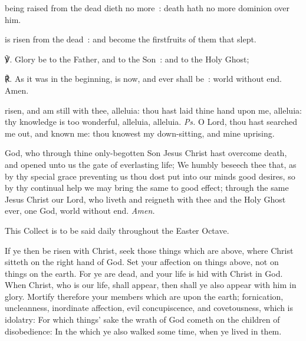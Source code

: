  being raised from the dead dieth no more~: death hath no more dominion over him.
    

 is risen from the dead~: and become the firstfruits of them that slept.

\par
℣. Glory be to the Father, and to the Son~: and to the Holy Ghost;\par
℟. As it was in the beginning, is now, and ever shall be~: world without end. Amen.

\introit
{} risen, and am still with thee, alleluia: thou hast laid thine hand upon me, alleluia: thy knowledge is too wonderful, alleluia, alleluia. \textit{Ps.} O Lord, thou hast searched me out, and known me: thou knowest my down-sitting, and mine uprising.

\collect\label{EasterCollect}
 God, who through thine only-begotten Son Jesus Christ hast overcome death, and opened unto us the gate of everlasting life; We humbly beseech thee that, as by thy special grace preventing us thou dost put into our minds good desires, so by thy continual help we may bring the same to good effect; through the same Jesus Christ our Lord, who liveth and reigneth with thee and the Holy Ghost ever, one God, world without end. \textit{Amen.}
\begin{rubric}
    This Collect is to be said daily throughout the Easter Octave.
\end{rubric}

 If ye then be risen with Christ, seek those things which are above, where Christ sitteth on the right hand of God. Set your affection on things above, not on things on the earth. For ye are dead, and your life is hid with Christ in God. When Christ, who is our life, shall appear, then shall ye also appear with him in glory. Mortify therefore your members which are upon the earth; fornication, uncleanness, inordinate affection, evil concupiscence, and covetousness, which is idolatry: For which things' sake the wrath of God cometh on the children of disobedience: In the which ye also walked some time, when ye lived in them.

